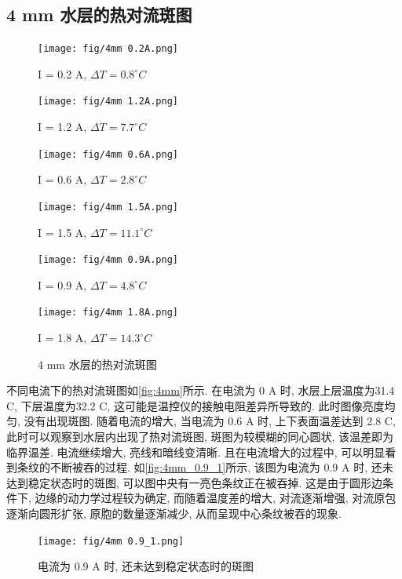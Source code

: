 \documentclass[font=default]{mpltx}
\begin{document}
  \subsection{4 mm 水层的热对流斑图}
  \begin{figure}[htbp]      
    \caption{4 mm 水层的热对流斑图}
    \begin{minipage}{0.32\linewidth}
      \vspace{3pt}
      \centerline{\texttt{[image: fig/4mm 0.2A.png]}}
      \centerline{I = 0.2 A, $\Delta T = 0.8^\circ C$}
      \vspace{3pt}
      \centerline{\texttt{[image: fig/4mm 1.2A.png]}}
      \centerline{I = 1.2 A, $\Delta T = 7.7^\circ C$}
    \end{minipage}
    \begin{minipage}{0.32\linewidth}
      \vspace{3pt}
      \centerline{\texttt{[image: fig/4mm 0.6A.png]}}
      \centerline{I = 0.6 A, $\Delta T = 2.8^\circ C$}
      \vspace{3pt}
      \centerline{\texttt{[image: fig/4mm 1.5A.png]}}
      \centerline{I = 1.5 A, $\Delta T = 11.1^\circ C$}
    \end{minipage}
    \begin{minipage}{0.32\linewidth}
      \vspace{3pt}
      \centerline{\texttt{[image: fig/4mm 0.9A.png]}}
      \centerline{I = 0.9 A, $\Delta T = 4.8^\circ C$}
      \vspace{3pt}
      \centerline{\texttt{[image: fig/4mm 1.8A.png]}}
      \centerline{I = 1.8 A, $\Delta T = 14.3^\circ C$}
    \end{minipage}
    \label{fig:4mm}
  \end{figure}
  不同电流下的热对流斑图如\autoref{fig:4mm}所示.
  在电流为 0 A 时, 水层上层温度为31.4 \circ C, 下层温度为32.2 \circ C, 这可能是温控仪的接触电阻差异所导致的. 此时图像亮度均匀, 没有出现斑图.
  随着电流的增大, 当电流为 0.6 A 时, 上下表面温差达到 2.8 \circ C, 此时可以观察到水层内出现了热对流斑图, 斑图为较模糊的同心圆状, 该温差即为临界温差.
  电流继续增大, 亮线和暗线变清晰.
  且在电流增大的过程中, 可以明显看到条纹的不断被吞的过程. 如\autoref{fig:4mm_0.9_1}所示, 该图为电流为 0.9 A 时, 还未达到稳定状态时的斑图, 
  可以图中央有一亮色条纹正在被吞掉. 这是由于圆形边条件下, 边缘的动力学过程较为确定, 而随着温度差的增大, 对流逐渐增强, 对流原包逐渐向圆形扩张, 原胞的数量逐渐减少,
  从而呈现中心条纹被吞的现象.

  \begin{figure}[htbp]
    \centering
    \texttt{[image: fig/4mm 0.9\_1.png]}
    \caption{电流为 0.9 A 时, 还未达到稳定状态时的斑图}
    \label{fig:4mm_0.9_1}
  \end{figure}
\end{document}
